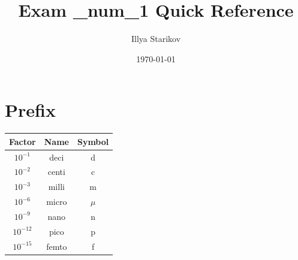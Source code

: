 \documentclass[12pt]{article}
\title{Exam \_num_1 Quick Reference}
\date{\today}
\author{Illya Starikov}
\begin{document}
\maketitle
\section{Prefix}

\begin{center}
    \begin{tabular}{|c|c|c|}
        \hline
        \textbf{Factor} & \textbf{Name} & \textbf{Symbol} \\ \hline
        $10^{-1}$   &   deci    &   d       \\ \hline
        $10^{-2}$   &   centi   &   c       \\ \hline
        $10^{-3}$   &   milli   &   m       \\ \hline
        $10^{-6}$   &   micro   &   $\mu$  \\ \hline
        $10^{-9}$   &   nano    &   n       \\ \hline
        $10^{-12}$  &   pico    &   p       \\ \hline
        $10^{-15}$  &   femto   &   f       \\ \hline
    \end{tabular}
\end{center}
\end{document}
